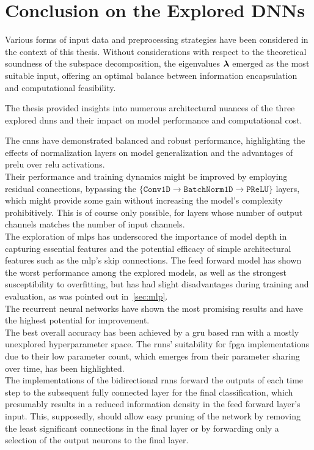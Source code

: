 \section{Conclusion on the Explored DNNs}
Various forms of input data and preprocessing strategies have been considered in the context of this thesis.
Without considerations with respect to the theoretical soundness of the subspace decomposition, the eigenvalues \( \boldsymbol{\lambda} \)
emerged as the most suitable input, offering an optimal balance between information encapsulation and computational
feasibility.

The thesis provided insights into numerous architectural nuances of the three explored \glspl{dnn} and their impact on
model performance and computational cost.

The \glspl{cnn} have demonstrated balanced and robust performance, highlighting the effects of normalization layers
on model generalization and the advantages of \gls{prelu} over \gls{relu} activations. \\
Their performance and training dynamics might be improved by employing residual connections, bypassing the
\( \{\texttt{Conv1D} \rightarrow \texttt{BatchNorm1D} \rightarrow \texttt{PReLU}\} \) layers, which might provide
some gain without increasing the model's complexity prohibitively. This is of course only possible, for layers whose
number of output channels matches the number of input channels. \\

The exploration of \glspl{mlp} has underscored the importance of model depth in capturing essential features and the potential
efficacy of simple architectural features such as the \gls{mlp}'s skip connections.
The feed forward model has shown the worst performance among the explored models, as well as the strongest susceptibility
to overfitting, but has had slight disadvantages during training and evaluation, as was pointed out in~\autoref{sec:mlp}. \\

The recurrent neural networks have shown the most promising results and have the highest potential for improvement.\\
The best overall accuracy has been achieved by a \gls{gru} based \gls{rnn} with a mostly unexplored hyperparameter space.
The \glspl{rnn}' suitability for \gls{fpga} implementations due to their low parameter count, which emerges from their
parameter sharing over time, has been highlighted. \\
The implementations of the bidirectional \glspl{rnn} forward the outputs of each time step to the subsequent fully connected
layer for the final classification, which presumably results in a reduced information density in the feed forward layer's input.
This, supposedly, should allow easy pruning of the network by removing the least significant connections in the final layer or
by forwarding only a selection of the output neurons to the final layer. \\


